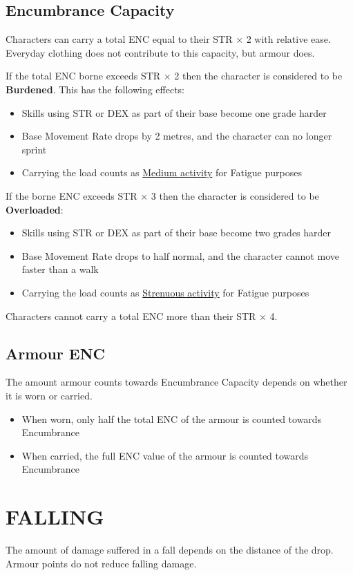 \documentclass[10pt]{article}
\begin{document}
\subsection{Encumbrance Capacity}
\label{sec:enc-capacity}
Characters can carry a total ENC equal to their STR × 2 with relative ease. Everyday clothing does not contribute to this capacity, but armour does.

If the total ENC borne exceeds STR × 2 then the character is considered to be \textbf{Burdened}. This has the following effects:
\begin{itemize}[leftmargin=*]
    \item Skills using STR or DEX as part of their base become one grade harder
    \item Base Movement Rate drops by 2 metres, and the character can no longer sprint
    \item Carrying the load counts as \hyperref[tab:physical-effort]{Medium activity} for Fatigue purposes 
\end{itemize}

If the borne ENC exceeds STR × 3 then the character is considered to be \textbf{Overloaded}:
\begin{itemize}[leftmargin=*]
    \item Skills using STR or DEX as part of their base become two grades harder
    \item Base Movement Rate drops to half normal, and the character cannot move faster than a walk
    \item Carrying the load counts as \hyperref[tab:physical-effort]{Strenuous activity} for Fatigue purposes
\end{itemize}

Characters cannot carry a total ENC more than their STR × 4.

\subsection{Armour ENC}
\label{sec:armor-enc}
The amount armour counts towards Encumbrance Capacity depends on whether it is worn or carried.
\begin{itemize}[leftmargin=*]
    \item When worn, only half the total ENC of the armour is counted towards Encumbrance
    \item When carried, the full ENC value of the armour is counted towards Encumbrance
\end{itemize}


\section{FALLING}
\label{sec:falling}
The amount of damage suffered in a fall depends on the distance of the drop. Armour points do not reduce falling damage.
\end{document}
